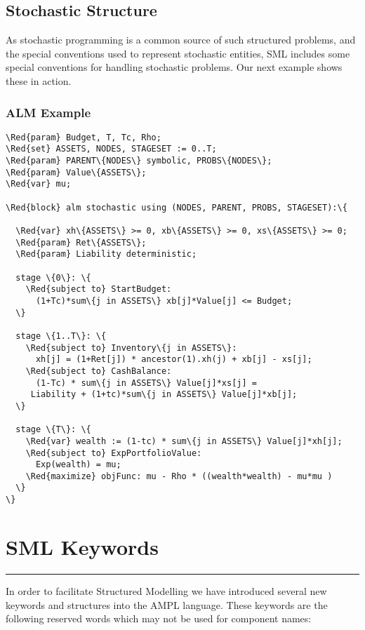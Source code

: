 \documentclass[10pt,a4paper]{book}
\begin{document}
\section{Stochastic Structure}

As stochastic programming is a common source of such structured problems, and
the special conventions used to represent stochastic entities, SML includes
some special conventions for handling stochastic problems. Our next example
shows these in action.

\subsection{ALM Example}

\begin{Verbatim}[frame=single,framerule=0.2pt,framesep=5pt,commandchars=\\\{\}]
\Red{param} Budget, T, Tc, Rho;
\Red{set} ASSETS, NODES, STAGESET := 0..T;
\Red{param} PARENT\{NODES\} symbolic, PROBS\{NODES\};
\Red{param} Value\{ASSETS\};
\Red{var} mu;

\Red{block} alm stochastic using (NODES, PARENT, PROBS, STAGESET):\{

  \Red{var} xh\{ASSETS\} >= 0, xb\{ASSETS\} >= 0, xs\{ASSETS\} >= 0;
  \Red{param} Ret\{ASSETS\};
  \Red{param} Liability deterministic;

  stage \{0\}: \{
    \Red{subject to} StartBudget:
      (1+Tc)*sum\{j in ASSETS\} xb[j]*Value[j] <= Budget;
  \}

  stage \{1..T\}: \{
    \Red{subject to} Inventory\{j in ASSETS\}:
      xh[j] = (1+Ret[j]) * ancestor(1).xh(j) + xb[j] - xs[j];
    \Red{subject to} CashBalance:
      (1-Tc) * sum\{j in ASSETS\} Value[j]*xs[j] = 
	 Liability + (1+tc)*sum\{j in ASSETS\} Value[j]*xb[j];
  \}

  stage \{T\}: \{
    \Red{var} wealth := (1-tc) * sum\{j in ASSETS\} Value[j]*xh[j];
    \Red{subject to} ExpPortfolioValue:
      Exp(wealth) = mu;
    \Red{maximize} objFunc: mu - Rho * ((wealth*wealth) - mu*mu )
  \}
\}
\end{Verbatim}

\chapter{SML Keywords}
\vspace{-0.6cm}\rule{\textwidth}{0.4ex}\vspace{0.1cm}
In order to facilitate Structured Modelling we have introduced several new
keywords and structures into the AMPL language. These keywords are the
following reserved words which may not be used for component names:
\end{document}
